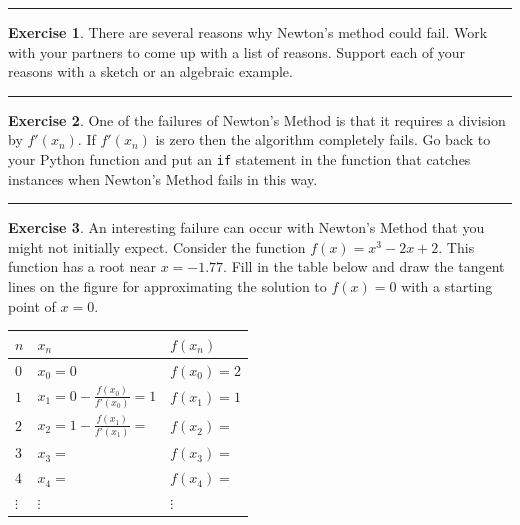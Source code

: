 \documentclass[
]{book}
\theoremstyle{definition}
\theoremstyle{definition}
\theoremstyle{definition}
\newtheorem{exercise}{Exercise}[chapter]
\theoremstyle{remark}
\begin{document}
\begin{center}\rule{0.5\linewidth}{0.5pt}\end{center}

\begin{exercise}
\protect\hypertarget{exr:unnamed-chunk-106}{}{\label{exr:unnamed-chunk-106} }There are several reasons why Newton's method could fail. Work with your
partners to come up with a list of reasons. Support each of
your reasons with a sketch or an algebraic example.
\end{exercise}

\begin{center}\rule{0.5\linewidth}{0.5pt}\end{center}

\begin{exercise}
\protect\hypertarget{exr:unnamed-chunk-107}{}{\label{exr:unnamed-chunk-107} }One of the failures of Newton's Method is that it requires a division by \(f'(x_n)\). If \(f'(x_n)\) is zero then the algorithm completely fails. Go back to your Python function and put an \texttt{if} statement in the function that catches instances when Newton's Method fails in this way.
\end{exercise}

\begin{center}\rule{0.5\linewidth}{0.5pt}\end{center}

\begin{exercise}
\protect\hypertarget{exr:unnamed-chunk-108}{}{\label{exr:unnamed-chunk-108} }An interesting failure can occur with Newton's Method that you might not
initially expect. Consider the function \(f(x) = x^3 - 2x + 2\). This
function has a root near \(x=-1.77\). Fill in the table below and draw the
tangent lines on the figure for approximating the solution to \(f(x) = 0\)
with a starting point of \(x=0\).

\begin{longtable}[]{@{}lll@{}}
\toprule
\(n\) & \(x_n\) & \(f(x_n)\)\tabularnewline
\midrule
\endhead
\(0\) & \(x_0 = 0\) & \(f(x_0) = 2\)\tabularnewline
\(1\) & \(x_1 = 0 - \frac{f(x_0)}{f'(x_0)} = 1\) & \(f(x_1) = 1\)\tabularnewline
\(2\) & \(x_2 = 1 - \frac{f(x_1)}{f'(x_1)} =\) & \(f(x_2) =\)\tabularnewline
\(3\) & \(x_3 =\) & \(f(x_3) =\)\tabularnewline
\(4\) & \(x_4 =\) & \(f(x_4) =\)\tabularnewline
\(\vdots\) & \(\vdots\) & \(\vdots\)\tabularnewline
\bottomrule
\end{longtable}
\end{exercise}
\end{document}
